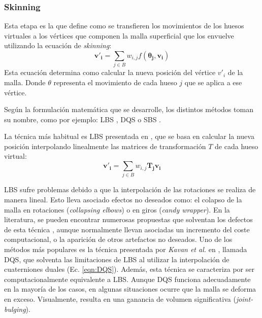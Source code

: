 \subsubsection{Skinning}
\label{art:skinning}

Esta etapa es la que define como se transfieren los movimientos de los huesos virtuales a los vértices que componen la malla superficial que los envuelve utilizando la ecuación de \emph{skinning}: 
\begin{equation}
\label{eqn:skinning}
\mathbf{v'_{i}} = \sum_{j \in B} w_{i,j}f(\mathbf{\theta_{j}},\mathbf{v_{i}}) 
\end{equation}
Esta ecuación determina como calcular la nueva posición del vértice $v'_{i}$ de la malla. Donde $\theta$ representa el movimiento de cada hueso $j$ que se aplica a ese vértice. %

Según la formulación matemática que se desarrolle, los distintos métodos toman su nombre, como por ejemplo: \ac{LBS} \cite{thalmann88}, \ac{DQS} \cite{Kavan2008} o \ac{SBS} \cite{Kavan:2005}.



La técnica más habitual es \ac{LBS} presentada en \cite{thalmann88}, que se basa en calcular la nueva posición interpolando linealmente las matrices de transformación $T$ de cada hueso virtual:
\begin{equation}
\label{eqn:LBS}
\mathbf{v'_{i}} = \sum_{j \in B} w_{i,j}\mathbf{T_{j}v_{i}}
\end{equation}

\ac{LBS} sufre problemas debido a que la interpolación de las rotaciones se realiza de manera lineal. Esto lleva asociado efectos no deseados como: el colapso de la malla  en rotaciones (\emph{collapsing elbows}) o en giros (\emph{candy wrapper}). En la literatura, se pueden encontrar numerosas propuestas que solventan los defectos de esta técnica \cite{rumman2016state}, aunque normalmente llevan asociadas un incremento del coste computacional, o la aparición de otros artefactos no deseados. Uno de los métodos más populares es la técnica presentada por \emph{Kavan et al.} en \cite{Kavan2008}, llamada \ac{DQS}, que solventa las limitaciones de \ac{LBS} al utilizar la interpolación de cuaterniones duales (Ec. \ref{eqn:DQS}). Además, esta técnica se caracteriza por ser computacionalmente equivalente a \ac{LBS}. Aunque \ac{DQS} funciona adecuadamente en la mayoría de los casos, en algunas situaciones ocurre que la malla se deforma en exceso. Visualmente, resulta en una ganancia de volumen significativa (\emph{joint-bulging}). 


